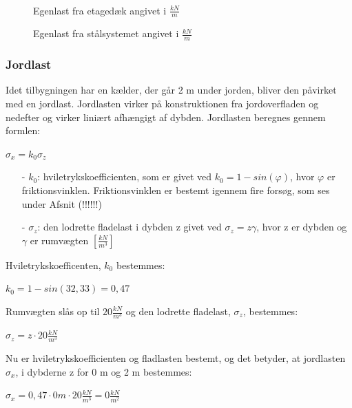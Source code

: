\begin{figure}[H]
\begin{minipage}[b]{0.48\textwidth}
	\end{minipage}\\ %
	\begin{minipage}[t]{0.48\textwidth}
		\caption{Egenlast fra etagedæk angivet i $\frac{kN}{m}$} %
		\label{fig:m}
	\end{minipage}\hfill
	\begin{minipage}[t]{0.48\textwidth}
		\caption{Egenlast fra stålsystemet angivet i $\frac{kN}{m}$} %
		\label{fig:n}
	\end{minipage}
\end{figure}

\subsubsection{Jordlast}
Idet tilbygningen har en kælder, der går 2 m under jorden, bliver den påvirket med en jordlast. Jordlasten virker på konstruktionen fra jordoverfladen og nedefter og virker liniært afhængigt af dybden.
\newline
\newline
Jordlasten beregnes gennem formlen:
\begin{center}
	$\sigma_x = k_0 \sigma_z$
\end{center}

\begin{itemize}
	\item[-] $k_0$: hviletrykskoefficienten, som er givet ved $k_0=1-sin(\varphi)$, hvor $\varphi$ er friktionsvinklen. Friktionsvinklen er bestemt igennem fire forsøg, som ses under Afsnit (!!!!!!)
	\item[-] $\sigma_z$: den lodrette fladelast i dybden z givet ved $\sigma_z = z\gamma$, hvor z er dybden og $\gamma$ er rumvægten $[\frac{kN}{m^3}]$
\end{itemize}

Hviletrykskoefficenten, $k_0$ bestemmes:
\begin{center}
	$k_0 = 1 - sin(32,\!33) = 0,\!47$
\end{center}

Rumvægten slås op til $20 \frac{kN}{m^3}$ \citep[ s. 386]{stabi} og den lodrette fladelast, $\sigma_z$, bestemmes:
\begin{center}
	$\sigma_z = z\cdot 20 \frac{kN}{m^3}$
\end{center}

Nu er hviletrykskoefficienten og fladlasten bestemt, og det betyder, at jordlasten $\sigma_x$, i dybderne z for 0 m og 2 m bestemmes:
\begin{center}
	$\sigma_x = 0,\!47\cdot 0 m\cdot 20 \frac{kN}{m^3} = 0 \frac{kN}{m^2}$
\end{center}


